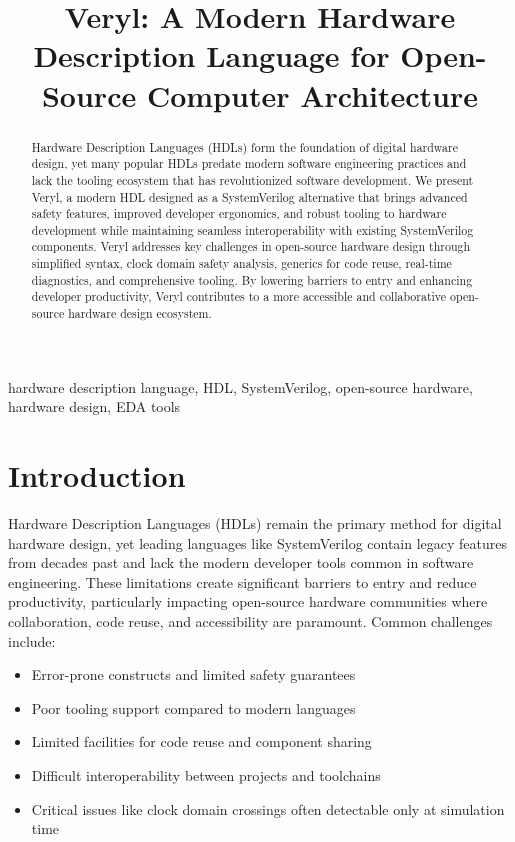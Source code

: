 \documentclass[conference]{IEEEtran}
\begin{document}
\title{Veryl: A Modern Hardware Description Language for Open-Source Computer Architecture}

\author{
\and
{}
\and
{}
}

\maketitle

\begin{abstract}
Hardware Description Languages (HDLs) form the foundation of digital hardware design, yet many popular HDLs predate modern software engineering practices and lack the tooling ecosystem that has revolutionized software development. We present Veryl, a modern HDL designed as a SystemVerilog alternative that brings advanced safety features, improved developer ergonomics, and robust tooling to hardware development while maintaining seamless interoperability with existing SystemVerilog components. Veryl addresses key challenges in open-source hardware design through simplified syntax, clock domain safety analysis, generics for code reuse, real-time diagnostics, and comprehensive tooling. By lowering barriers to entry and enhancing developer productivity, Veryl contributes to a more accessible and collaborative open-source hardware design ecosystem.
\end{abstract}

\begin{IEEEkeywords}
hardware description language, HDL, SystemVerilog, open-source hardware, hardware design, EDA tools
\end{IEEEkeywords}

\section{Introduction}
Hardware Description Languages (HDLs) remain the primary method for digital hardware design, yet leading languages like SystemVerilog contain legacy features from decades past and lack the modern developer tools common in software engineering. These limitations create significant barriers to entry and reduce productivity, particularly impacting open-source hardware communities where collaboration, code reuse, and accessibility are paramount. Common challenges include:

\begin{itemize}
\item Error-prone constructs and limited safety guarantees
\item Poor tooling support compared to modern languages
\item Limited facilities for code reuse and component sharing
\item Difficult interoperability between projects and toolchains
\item Critical issues like clock domain crossings often detectable only at
simulation time
\end{itemize}
\end{document}

